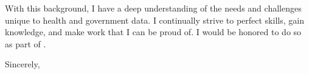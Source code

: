 \documentclass[11pt,twoside]{letter}
\begin{document}
\begin{letter}{}
With this background, I have a deep understanding of the needs and challenges unique to
health and government data.
I continually strive to perfect skills, gain knowledge, and make work that I can be proud of.
I would be honored to do so as part of \cname.
  \closing{Sincerely,}


\end{letter}
\end{document}
